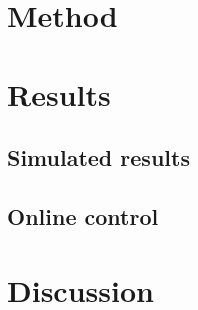 \section{Method}

\section{Results}

\subsection{Simulated results}

\subsection{Online control}

\section{Discussion}



